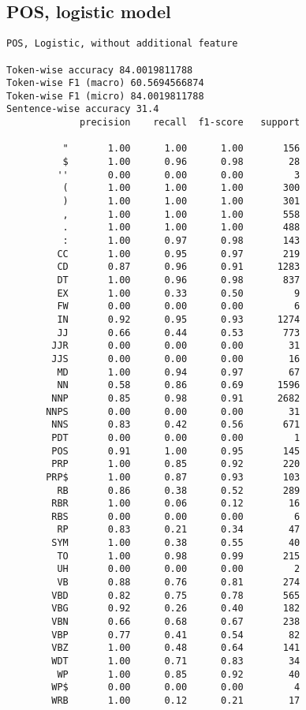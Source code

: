 \documentclass[twoside]{article}
\begin{document}
\subsection{POS, logistic model} 
\begin{lstlisting}
POS, Logistic, without additional feature

Token-wise accuracy 84.0019811788
Token-wise F1 (macro) 60.5694566874
Token-wise F1 (micro) 84.0019811788
Sentence-wise accuracy 31.4
             precision    recall  f1-score   support

          "       1.00      1.00      1.00       156
          $       1.00      0.96      0.98        28
         ''       0.00      0.00      0.00         3
          (       1.00      1.00      1.00       300
          )       1.00      1.00      1.00       301
          ,       1.00      1.00      1.00       558
          .       1.00      1.00      1.00       488
          :       1.00      0.97      0.98       143
         CC       1.00      0.95      0.97       219
         CD       0.87      0.96      0.91      1283
         DT       1.00      0.96      0.98       837
         EX       1.00      0.33      0.50         9
         FW       0.00      0.00      0.00         6
         IN       0.92      0.95      0.93      1274
         JJ       0.66      0.44      0.53       773
        JJR       0.00      0.00      0.00        31
        JJS       0.00      0.00      0.00        16
         MD       1.00      0.94      0.97        67
         NN       0.58      0.86      0.69      1596
        NNP       0.85      0.98      0.91      2682
       NNPS       0.00      0.00      0.00        31
        NNS       0.83      0.42      0.56       671
        PDT       0.00      0.00      0.00         1
        POS       0.91      1.00      0.95       145
        PRP       1.00      0.85      0.92       220
       PRP$       1.00      0.87      0.93       103
         RB       0.86      0.38      0.52       289
        RBR       1.00      0.06      0.12        16
        RBS       0.00      0.00      0.00         6
         RP       0.83      0.21      0.34        47
        SYM       1.00      0.38      0.55        40
         TO       1.00      0.98      0.99       215
         UH       0.00      0.00      0.00         2
         VB       0.88      0.76      0.81       274
        VBD       0.82      0.75      0.78       565
        VBG       0.92      0.26      0.40       182
        VBN       0.66      0.68      0.67       238
        VBP       0.77      0.41      0.54        82
        VBZ       1.00      0.48      0.64       141
        WDT       1.00      0.71      0.83        34
         WP       1.00      0.85      0.92        40
        WP$       0.00      0.00      0.00         4
        WRB       1.00      0.12      0.21        17


\end{lstlisting}
\end{document}
